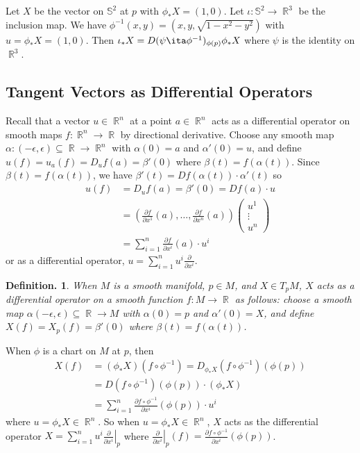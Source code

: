 \documentclass[11pt, a4paper]{memoir}
\DeclareMathOperator{\R}{{\mathbb{R}}}
\theoremstyle{change}
\theoremstyle{plain}
\theoremstyle{nonumberplain}
\newtheorem{definition}{Definition.}
\newcommand{\prt}[2]{\ensuremath{\frac{\partial #1}{\partial #2}}}
\numberwithin{equation}{section}
\begin{document}
Let $X$ be the vector on $\mathbb{S}^2$ at $p$ with $\phi_*X=(1,0)$.
Let $\iota:\mathbb{S}^2\to\R^3$ be the inclusion map.
We have $\phi^{-1}(x,y)=(x,y,\sqrt{1-x^2-y^2})$ with $u=\phi_*X=(1,0)$.
Then $\iota_*X=D(\psi\ita\phi^{-1})_{\phi(p)}\phi_*X$ where $\psi$ is the identity on $\R^3$.
\subsection{Tangent Vectors as Differential Operators}
Recall that a vector $u\in\R^n$ at a point $a\in\R^n$ acts as a differential operator on smooth maps $f:\R^n\to\R$ by directional derivative.
Choose any smooth map $\alpha:(-\epsilon,\epsilon)\subseteq\R\to\R^n$ with $\alpha(0)=a$ and $\alpha'(0)=u$, and define $u(f)=u_a(f)=D_uf(a)=\beta'(0)$ where $\beta(t)=f(\alpha(t))$.
Since $\beta(t)=f(\alpha(t))$, we have $\beta'(t)=Df(\alpha(t))\cdot\alpha'(t)$ so
\begin{align*}
    u(f) &= D_uf(a)=\beta'(0)=Df(a)\cdot u\\
         &= \left(\prt{f}{x^1}(a),\ldots,\prt{f}{x^n}(a)\right)\begin{pmatrix}u^1\\\vdots\\u^n\end{pmatrix}\\
         &=\sum_{i=1}^n\prt{f}{x^i}(a)\cdot u^i
\end{align*}
or as a differential operator, $u=\sum_{i=1}^n u^i\prt{}{x^i}$.
\begin{definition}
    When $M$ is a smooth manifold, $p\in M$, and $X\in T_pM$, $X$ acts as a differential operator on a smooth function $f:M\to\R$ as follows: choose a smooth map $\alpha(-\epsilon,\epsilon)\subseteq\R\to M$ with $\alpha(0)=p$ and $\alpha'(0)=X$, and define $X(f)=X_p(f)=\beta'(0)$ where $\beta(t)=f(\alpha(t))$.
\end{definition}
When $\phi$ is a chart on $M$ at $p$, then
\begin{align*}
    X(f) &= (\phi_*X)(f\circ\phi^{-1})=D_{\phi_*X}(f\circ\phi^{-1})(\phi(p))\\
         &= D(f\circ\phi^{-1})(\phi(p))\cdot(\phi_*X)\\
         &= \sum_{i=1}^n \prt{f\circ\phi^{-1}}{x^i}(\phi(p))\cdot u^i
\end{align*}
where $u=\phi_*X\in\R^n$.
So when $u=\phi_*X\in\R^n$, $X$ acts as the differential operator $X=\sum_{i=1}^n u^i\left.\prt{}{x^i}\right\rvert_p$ where $\left.\prt{}{x^i}\right\rvert_p(f)=\prt{f\circ\phi^{-1}}{x^i}(\phi(p))$.
\end{document}
